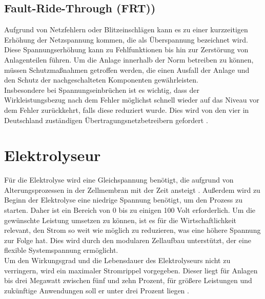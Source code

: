 	
	
	
	\subsection{Fault-Ride-Through (FRT))}
	Aufgrund von Netzfehlern oder Blitzeinschlägen kann es zu einer kurzzeitigen Erhöhung der Netzspannung kommen, die als Überspannung bezeichnet wird. Diese Spannungserhöhung kann zu Fehlfunktionen bis hin zur Zerstörung von Anlagenteilen führen. Um die Anlage innerhalb der Norm betreiben zu können, müssen Schutzmaßnahmen getroffen werden, die einen Ausfall der Anlage und den Schutz der nachgeschalteten Komponenten gewährleisten.  \\

	Insbesondere bei Spannungseinbrüchen ist es wichtig, dass der Wirkleistungsbezug nach dem Fehler möglichst schnell wieder auf das Niveau vor dem Fehler zurückkehrt, falls diese reduziert wurde. Dies wird von den vier in Deutschland zuständigen Übertragungsnetzbetreibern gefordert \cite{4UNB}.


\section{Elektrolyseur}
Für die Elektrolyse wird eine Gleichspannung benötigt, die aufgrund von Alterungsprozessen in der Zellmembran mit der Zeit ansteigt \cite{HydrogenElectronicTopologies}. Außerdem wird zu Beginn der Elektrolyse eine niedrige Spannung benötigt, um den Prozess zu starten. Daher ist ein Bereich von 0 bis zu einigen 100 Volt erforderlich. Um die gewünschte Leistung umsetzen zu können, ist es für die Wirtschaftlichkeit relevant, den Strom so weit wie möglich zu reduzieren, was eine höhere Spannung zur Folge hat. Dies wird durch den modularen Zellaufbau unterstützt, der eine flexible Systemspannung ermöglicht. \\
Um den Wirkungsgrad und die Lebensdauer des Elektrolyseurs nicht zu verringern, wird ein maximaler Stromrippel vorgegeben. Dieser liegt für Anlagen bis drei Megawatt zwischen fünf und zehn Prozent, für größere Leistungen und zukünftige Anwendungen soll er unter drei Prozent liegen \cite{HydrogenRectifier}.



